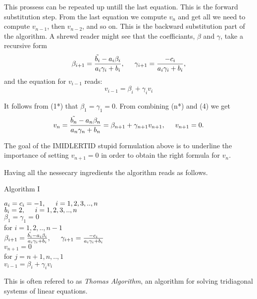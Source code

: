 \documentclass[11pt,a4paper,english]{article}
\begin{document}
This prossess can be repeated up untill the last equation. This is the forward substitution step. From the last equation we compute $v_n$ and get all we need to compute $v_{n-1}$, then $v_{n-2}$, and so on. This is the backward substitution part of the algorithm. A shrewd reader might see that the coefficiants, $\beta$ and $\gamma$, take a recursive form
\begin{align*}
\beta_{i+1} = \frac{\tilde{b_i}-a_i \beta_i}{a_i \gamma_i + b_i} , \hspace{0.5cm} \gamma_{i+1}=\frac{-c_i}{a_i \gamma_i + b_i},
\end{align*}
and the equation for $v_{i-1}$ reads: 
\begin{equation}
v_{i-1} = \beta_i + \gamma_i v_i
\end{equation}

It follows from (1*) that $\beta_1 = \gamma_1 = 0$.
From combining (n*) and (4) we get 
\begin{align*}
v_n = \frac{\tilde{b_n}-a_n \beta_n}{a_n \gamma_n + b_n} = \beta_{n+1} + \gamma_{n+1} v_{n+1}, \hspace{0.5cm} v_{n+1} = 0.
\end{align*}

The goal of the IMIDLERTID stupid formulation above is to underline the importance of setting $v_{n+1}=0$ in order to obtain the right formula for $v_n$.

Having all the nessecary ingredients the algorithm reads as follows.
\vspace{0.5cm}\\
\centerline{Algorithm I}
\begin{tcolorbox}
$a_i = c_i = -1, \hspace{0.5cm}  i=1,2,3,..,n$ \\
$b_i = 2, \hspace{0.5cm}  i=1,2,3,..,n $\\
$\beta_1 = \gamma_1 = 0$ \\
for $i=1,2,..,n-1$ \\ \vspace{0.5cm} 
 \hspace{0.5cm} $ \beta_{i+1} = \frac{\tilde{b_i}-a_i \beta_i}{a_i \gamma_i + b_i} , \hspace{0.5cm} \gamma_{i+1}=\frac{-c_i}{a_i \gamma_i + b_i} $ \vspace{0.2cm}  \\
 $v_{n+1} = 0$ \\
for $j=n+1, n,..,1$ \\ \vspace{0.5cm} 
 \hspace{0.5cm} $v_{i-1} = \beta_i + \gamma_i v_i$

\end{tcolorbox} 


This is often refered to as \emph{Thomas Algorithm}, an algorithm for solving tridiagonal systems of linear equations.
\end{document}
